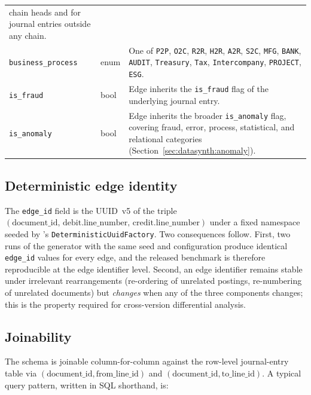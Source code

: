 \begin{table}[H]
\begin{tabular}{p{1.6cm}p{2.5cm}p{8.0cm}}
      chain heads and for journal entries outside any chain.\\
    \texttt{business\_process}   & enum     &
      One of \texttt{P2P}, \texttt{O2C}, \texttt{R2R},
      \texttt{H2R}, \texttt{A2R}, \texttt{S2C}, \texttt{MFG},
      \texttt{BANK}, \texttt{AUDIT}, \texttt{Treasury},
      \texttt{Tax}, \texttt{Intercompany}, \texttt{PROJECT},
      \texttt{ESG}.\\
    \texttt{is\_fraud}           & bool     &
      Edge inherits the \texttt{is\_fraud} flag of the underlying
      journal entry.\\
    \texttt{is\_anomaly}         & bool     &
      Edge inherits the broader \texttt{is\_anomaly} flag,
      covering fraud, error, process, statistical, and relational
      categories (Section~\ref{sec:datasynth:anomaly}).\\
    \bottomrule
  \end{tabular}
\end{table}

\subsection{Deterministic edge identity}
\label{sec:graph:determinism}

The \texttt{edge\_id} field is the UUID~v5 of the triple
$(\text{document\_id},\, \text{debit.line\_number},\,
  \text{credit.line\_number})$
under a fixed namespace seeded by \system{}'s
\texttt{DeterministicUuidFactory}.  Two consequences follow.
First, two runs of the generator with the same seed and
configuration produce identical \texttt{edge\_id} values for every
edge, and the released benchmark is therefore reproducible at the
edge identifier level.  Second, an edge identifier remains stable
under irrelevant rearrangements (re-ordering of unrelated postings,
re-numbering of unrelated documents) but \emph{changes} when any
of the three components changes; this is the property required
for cross-version differential analysis.

\subsection{Joinability}
\label{sec:graph:joinability}

The schema is joinable column-for-column against the row-level
journal-entry table via $(\text{document\_id},
  \text{from\_line\_id})$ and $(\text{document\_id},
  \text{to\_line\_id})$.  A typical query pattern, written in SQL
shorthand, is:

